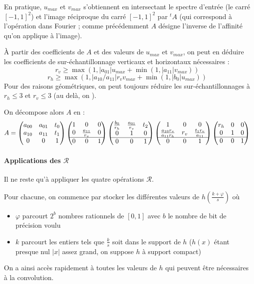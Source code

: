 		En pratique, $u_{max}$ et $v_{max}$ s'obtiennent en intersectant le spectre d'entrée (le carré $[-1,1]^2$) et l'image réciproque du carré $[-1,1]^2$ par $^t\!A$ (qui correspond à l'opération dans Fourier ; comme précédemment $A$ désigne l'inverse de l'affinité qu'on applique à l'image).
		
		À partir des coefficients de $A$ et des valeurs de $u_{max}$ et $v_{max}$, on peut en déduire les coefficients de sur-échantillonnage verticaux et horizontaux nécessaires :
		\[r_v \geq \max (1,|a_{01}|u_{max}+\min (1,|a_{11}|v_{max}))\]
		\[r_h \geq \max (1,|a_{10}/a_{11}|r_vv_{max}+\min (1,|b_0|u_{max}))\]
		Pour des raisons géométriques, on peut toujours réduire les sur-échantillonnages à $r_h \leq 3$ et $r_v \leq 3$ (au delà, on ).
		
		On décompose alors $A$ en :
		\[
			A = \begin{pmatrix} a_{00} & a_{01} & t_0\\ a_{10} & a_{11} & t_1\\0&0&1 \end{pmatrix}
			\begin{pmatrix} 1 & 0 & 0\\ 0 & \frac{a_{11}}{r_v} & 0\\ \hline 0 & 0 & 1 \end{pmatrix}
			\begin{pmatrix} \frac{b_{0}}{r_h} & \frac{a_{01}}{r_v} & t_2\\ 0 & 1 & 0\\ \hline 0 & 0 & 1 \end{pmatrix}
			\begin{pmatrix} 1 & 0 & 0\\ \frac{a_{10}r_v}{a_{11}r_h} & r_v & \frac{t_1r_v}{a_{11}}\\ \hline 0 & 0 & 1 \end{pmatrix}
			\begin{pmatrix} r_h & 0 & 0\\ 0 & 1 & 0\\ \hline 0 & 0 & 1 \end{pmatrix}
		\]

	\paragraph{Applications des $\mathcal R$}
		
		Il ne reste qu'à appliquer les quatre opérations $\mathcal R$.
		
		Pour chacune, on commence par stocker les différentes valeurs de $h(\frac{k+\varphi}{s})$ où
		\begin{itemize}
		\item $\varphi$ parcourt $2^b$ nombres rationnels de $[0,1]$ avec $b$ le nombre de bit de précision voulu
		\item $k$ parcourt les entiers tels que $\frac{k}{s}$ soit dans le support de $h$ ($h(x)$ étant presque nul $|x|$ assez grand, on suppose $h$ à support compact)
		\end{itemize}
		On a ainsi accès rapidement à toutes les valeurs de $h$ qui peuvent être nécessaires à la convolution.
